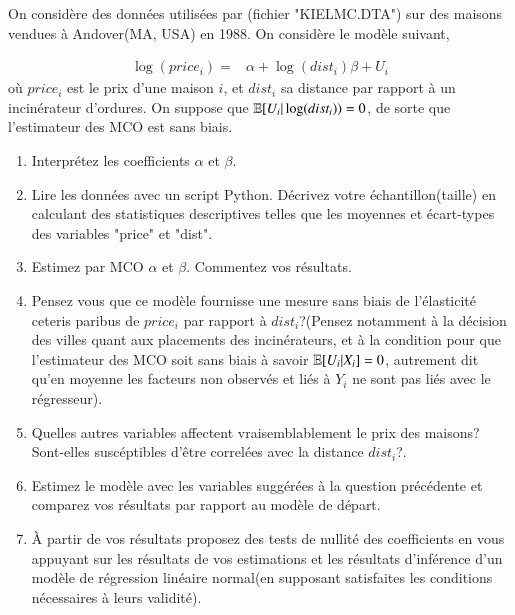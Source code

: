 \documentclass[10pt, reqno]{amsart}
\begin{document}
\medskip

On considère des données utilisées par \cite{KielMcCain1995}(fichier "KIELMC.DTA") sur des maisons vendues à Andover(MA, USA) en 1988. On considère le modèle suivant,

\begin{align*}
\log(price_i) =& \alpha + \log(dist_i)\beta + U_i
\end{align*}
où $price_i$ est le prix d'une maison $i$, et $dist_i$ sa distance par rapport à un incinérateur d'ordures. On suppose que $\mathbb{E}[U_i| \log(dist_i)) = 0$, de sorte que l'estimateur des MCO est sans biais.

 \begin{enumerate}
 \item Interprétez les coefficients $\alpha$ et $\beta$. 
\item Lire les données avec un script Python. Décrivez votre
  échantillon(taille) en calculant des statistiques descriptives
  telles que les moyennes et
  écart-types des variables "price" et "dist".
 \item Estimez par MCO $\alpha$ et $\beta$. Commentez vos résultats.
 \item Pensez vous que ce modèle fournisse une mesure sans biais de l'élasticité ceteris paribus de $price_i$ par rapport à $dist_i$?(Pensez  notamment à la décision des villes quant aux placements des incinérateurs, et à la condition pour que l'estimateur des MCO soit sans biais à savoir $\mathbb{E}[U_i|X_i] = 0$, autrement dit qu'en moyenne les facteurs non observés et liés à $Y_i$ ne sont pas liés avec le régresseur).
 \item Quelles autres variables affectent vraisemblablement le prix des
   maisons? Sont-elles suscéptibles d'être correlées avec la distance
   $dist_i$?.
  \item Estimez le modèle avec les variables suggérées à la question précédente et comparez vos résultats 
  par rapport au modèle de départ. 
  \item À partir de vos résultats proposez des tests de nullité des coefficients en vous appuyant sur 
  les résultats de vos estimations et les résultats d'inférence d'un modèle de régression linéaire normal(en supposant 
  satisfaites les conditions nécessaires à leurs validité).
 \end{enumerate}



 
\end{document}
